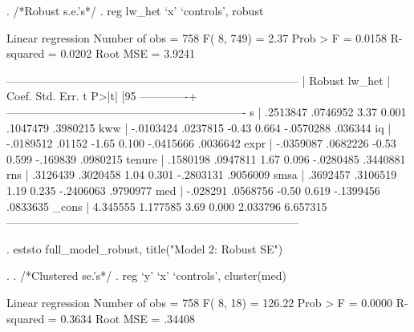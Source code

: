 \documentclass[12pt]{article}
\begin{document}
\begin{stlog}
  
. /*Robust s.e.'s*/
. reg lw_het `x' `controls', robust

Linear regression                                      Number of obs =     758
                                                       F(  8,   749) =    2.37
                                                       Prob > F      =  0.0158
                                                       R-squared     =  0.0202
                                                       Root MSE      =  3.9241

------------------------------------------------------------------------------
             |               Robust
      lw_het |      Coef.   Std. Err.      t    P>|t|     [95%
-------------+----------------------------------------------------------------
           s |   .2513847   .0746952     3.37   0.001     .1047479    .3980215
         kww |  -.0103424   .0237815    -0.43   0.664    -.0570288     .036344
          iq |  -.0189512     .01152    -1.65   0.100    -.0415666    .0036642
        expr |  -.0359087   .0682226    -0.53   0.599     -.169839    .0980215
      tenure |   .1580198   .0947811     1.67   0.096    -.0280485    .3440881
         rns |   .3126439   .3020458     1.04   0.301    -.2803131    .9056009
        smsa |   .3692457   .3106519     1.19   0.235    -.2406063    .9790977
         med |   -.028291   .0568756    -0.50   0.619    -.1399456    .0833635
       _cons |   4.345555   1.177585     3.69   0.000     2.033796    6.657315
------------------------------------------------------------------------------

. eststo full_model_robust, title("Model 2: Robust SE")

. 
. /*Clustered se.'s*/
. reg `y' `x' `controls', cluster(med)

Linear regression                                      Number of obs =     758
                                                       F(  8,    18) =  126.22
                                                       Prob > F      =  0.0000
                                                       R-squared     =  0.3634
                                                       Root MSE      =  .34408


\end{stlog}
\end{document}
